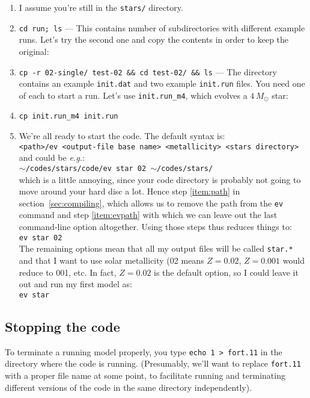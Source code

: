 \begin{enumerate}
\item I assume you're still in the \texttt{stars/} directory.
\item \texttt{cd run; ls} ---  This contains number of subdirectories with different example runs.  Let's try the second one and copy the contents in order to keep the original:
\item \texttt{cp -r 02-single/ test-02 \&\& cd test-02/ \&\& ls} --- The directory contains an example \texttt{init.dat} and two example \texttt{init.run} files.  
  You need one of each to start a run.  Let's use \texttt{init.run\_m4}, which evolves a $4\,M_\odot$ star:
\item \texttt{cp init.run\_m4 init.run}
\item We're all ready to start the code.  The default syntax is: \\
  \texttt{<path>/ev <output-file base name> <metallicity> <stars directory>} \\
  and could be \emph{e.g.}: \\
  \texttt{$\sim$/codes/stars/code/ev star 02 $\sim$/codes/stars/} \\
  which is a little annoying, since your code directory is probably not going to move around your hard disc a lot.  Hence step \ref{item:path} in section~\ref{sec:compiling},
  which allows us to remove the path from the \texttt{ev} command and step \ref{item:evpath} with which we can leave out the last command-line option altogether.
  Using those steps thus reduces things to: \\
  \texttt{ev star 02} \\
  The remaining options mean that all my output files will be called \texttt{star.*} and that I want to use solar metallicity (02 means $Z=0.02$, $Z=0.001$ would reduce to 001, etc.
  In fact, $Z=0.02$ is the default option, so I could leave it out and run my first model as: \\
  \texttt{ev star}
\end{enumerate}



\subsection{Stopping the code}
\label{sec:stop}

To terminate a running model properly, you type \texttt{echo 1 > fort.11} in the directory where the code is running.
(Presumably, we'll want to replace \texttt{fort.11} with a proper file name at some point, to facilitate running
and terminating different versions of the code in the same directory independently).